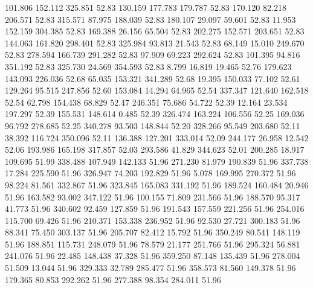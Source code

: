  101.806  152.112  325.851        52.83
 130.159  177.783  179.787        52.83
 170.120   82.218  206.571        52.83
 315.571   87.975  188.039        52.83
 180.107   29.097   59.601        52.83
  11.953  152.159  304.385        52.83
 169.388   26.156   65.504        52.83
 202.275  152.571  203.651        52.83
 144.063  161.820  298.401        52.83
 325.984   93.813   21.543        52.83
  68.149   15.010  249.670        52.83
 278.594  166.739  291.282        52.83
  97.909   69.223  292.624        52.83
 101.395   94.816  351.192        52.83
 325.730   24.569  354.593        52.83
   8.799   16.819   19.465        52.76
 179.623  143.093  226.036        52.68
  65.035  153.321  341.289        52.68
  19.395  150.033   77.102        52.61
 129.264   95.515  247.856        52.60
 153.084   14.294   64.965        52.54
 337.347  121.640  162.518        52.54
  62.798  154.438   68.829        52.47
 246.351   75.686   54.722        52.39
  12.164   23.534  197.297        52.39
 155.531  148.614    0.485        52.39
 326.474  163.224  106.556        52.25
 169.036   96.792  278.685        52.25
 340.278   93.503  148.844        52.20
 328.266   95.549  203.680        52.11
  38.392  116.724  350.096        52.11
 136.388  127.201  333.014        52.09
 244.177   26.958   12.542        52.06
 193.986  165.198  317.857        52.03
 293.586   41.829  344.623        52.01
 200.285   18.917  109.695        51.99
 338.488  107.949  142.133        51.96
 271.230   81.979  190.839        51.96
 337.738   17.284  225.590        51.96
 326.947   74.203  192.829        51.96
   5.078  169.995  270.372        51.96
  98.224   81.561  332.867        51.96
 323.845  165.083  331.192        51.96
 189.524  160.484   20.946        51.96
 163.582   93.002  347.122        51.96
 100.155   71.809  231.566        51.96
 188.570   95.317   41.773        51.96
 340.602   92.459  127.859        51.96
 191.543  157.559  221.256        51.96
 254.016  115.700   69.426        51.96
 210.371  153.338  236.952        51.96
  92.530   27.721  300.183        51.96
  88.341   75.450  303.137        51.96
 205.707   82.412   15.792        51.96
 350.249   80.541  148.119        51.96
 188.851  115.731  248.079        51.96
  78.579   21.177  251.766        51.96
 295.324   56.881  241.076        51.96
  22.485  148.438   37.328        51.96
 359.250   87.148  135.439        51.96
 278.004   51.509   13.044        51.96
 329.333   32.789  285.477        51.96
 358.573   81.560  149.378        51.96
 179.365   80.853  292.262        51.96
 277.388   98.354  284.011        51.96

